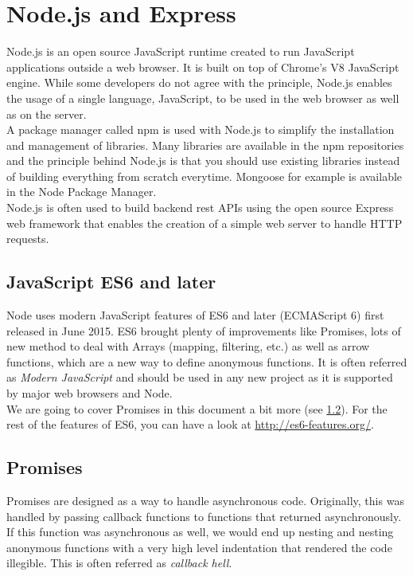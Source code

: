 \documentclass[twoside, openright,11pt,a4paper]{book}
\begin{document}
\section{Node.js and Express}
\label{node}
Node.js\cite{node:website}\cite{github:node} is an open source JavaScript runtime created to run JavaScript applications outside a web browser. It is built on top of Chrome's V8 JavaScript engine. While some developers do not agree with the principle, Node.js enables the usage of a single language, JavaScript, to be used in the web browser as well as on the server. \\

A package manager called \gls{npm}\cite{npm:website} is used with Node.js to simplify the installation and management of libraries.   Many libraries are available in the \gls{npm} repositories and the principle behind Node.js is that you should use existing libraries instead of building everything from scratch everytime. Mongoose for example is available in the Node Package Manager. \\

Node.js is often used to build backend \gls{rest} APIs using the open source Express\cite{express:website}\cite{github:express} web framework that enables the creation of a simple web server to handle HTTP requests.
\subsection{JavaScript ES6 and later}
Node uses modern JavaScript features of ES6 and later\cite{wiki:ecmascript} (ECMAScript 6) first released in June 2015. ES6 brought plenty of improvements like Promises, lots of new method to deal with Arrays (mapping, filtering, etc.) as well as arrow functions, which are a new way to define anonymous functions. It is often referred as \emph{Modern JavaScript} and should be used in any new project as it is supported by major web browsers and Node. \\

We are going to cover Promises in this document a bit more (see \ref{promises}). For the rest of the features of ES6, you can have a look at \url{http://es6-features.org/}.
\subsection{Promises}
\label{promises}
Promises\cite{mdn:doc:promises} are designed as a way to handle asynchronous code. Originally, this was handled by passing callback functions to functions that returned asynchronously. If this function was asynchronous as well, we would end up nesting and nesting anonymous functions with a very high level indentation that rendered the code illegible. This is often referred as \emph{callback hell}. \\
\end{document}
